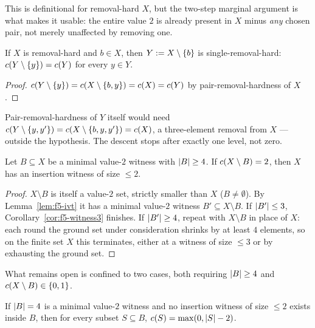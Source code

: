 This is definitional for removal-hard $X$, but the two-step marginal argument
is what makes it usable: the entire value $2$ is already present in $X$ minus
\emph{any} chosen pair, not merely unaffected by removing one.

\begin{proposition}
\label{prop:f5-onelevel}
If $X$ is removal-hard and $b \in X$, then $Y := X \setminus \left\{b\right\}$ is
single-removal-hard: $c(Y \setminus \left\{y\right\}) = c(Y)$ for every $y \in Y$.
\end{proposition}

\begin{proof}
$c(Y \setminus \left\{y\right\}) = c(X \setminus \left\{b,y\right\}) = c(X) = c(Y)$
by pair-removal-hardness of $X$.
\end{proof}

Pair-removal-hardness of $Y$ itself would need
$c(Y \setminus \left\{y,y'\right\}) = c(X \setminus \left\{b,y,y'\right\}) = c(X)$,
a three-element removal from $X$ --- outside the hypothesis. The descent stops
after exactly one level, not zero.

\begin{proposition}[The $\cost(X\setminus B) = 2$ case]
\label{prop:f5-case2}
Let $B \subseteq X$ be a minimal value-$2$ witness with $\left\lvert B\right\rvert \ge 4$. If
$\cost(X \setminus B) = 2$, then $X$ has an insertion witness of size $\le 2$.
\end{proposition}

\begin{proof}
$X \setminus B$ is itself a value-$2$ set, strictly smaller than $X$
($B \ne \emptyset$). By Lemma~\ref{lem:f5-ivt} it has a minimal value-$2$
witness $B' \subseteq X \setminus B$. If $\left\lvert B'\right\rvert \le 3$,
Corollary~\ref{cor:f5-witness3} finishes. If $\left\lvert B'\right\rvert \ge 4$, repeat with
$X \setminus B$ in place of $X$: each round the ground set under consideration
shrinks by at least $4$ elements, so on the finite set $X$ this terminates,
either at a witness of size $\le 3$ or by exhausting the ground set.
\end{proof}

What remains open is confined to two cases, both requiring $\left\lvert B\right\rvert \ge 4$ and
$c(X \setminus B) \in \left\{0, 1\right\}$.

\begin{proposition}[Only correct as stated at $\abs B = 4$]
\label{prop:f5-forcedstructure}
If $\abs B = 4$ is a minimal value-$2$ witness and no insertion witness of
size $\le 2$ exists inside $B$, then for every subset $S \subseteq B$,
$c(S) = \max(0, \left\lvert S\right\rvert - 2)$.
\end{proposition}

